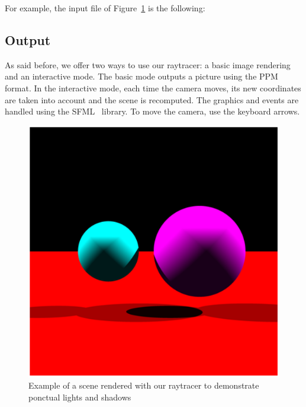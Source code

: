 \documentclass[a4paper,12pt,journal,twoside,compsoc]{PPIEEEtran}
\begin{document}
For example, the input file of Figure~\ref{Fig:shadow} is the following:\\
\noindent{}

\subsection{Output}
As said before, we offer two ways to use our raytracer: a basic image rendering and an interactive mode. The basic mode outputs a picture using the PPM~\cite{ppm} format. In the interactive mode, each time the camera moves, its new coordinates are taken into account and the scene is recomputed. The graphics and events are handled using the SFML~\cite{sfml} library. To move the camera, use the keyboard arrows.

\begin{figure}
\includegraphics[scale=1]{one}
\caption{Example of a scene rendered with our raytracer to demonstrate ponctual lights and shadows}
\label{Fig:shadow}
\end{figure}
\end{document}
